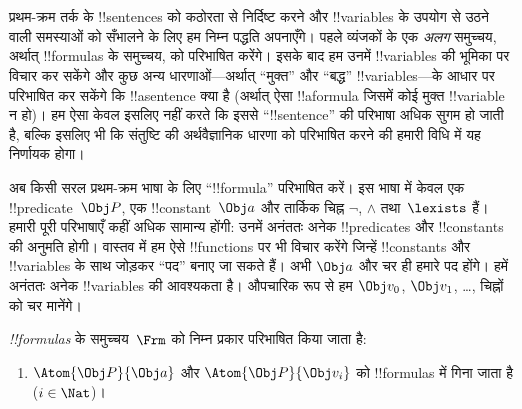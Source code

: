 \documentclass[../../../include/open-logic-section]{subfiles}
\begin{document}

\section{}

प्रथम-क्रम तर्क के !!{sentence}s को कठोरता से निर्दिष्ट करने और !!{variable}s
के उपयोग से उठने वाली समस्याओं को सँभालने के लिए हम निम्न पद्धति अपनाएँगे।
पहले व्यंजकों के एक \emph{अलग} समुच्चय, अर्थात् !!{formula}s के समुच्चय, को परिभाषित
करेंगे। इसके बाद हम उनमें !!{variable}s की भूमिका पर विचार कर सकेंगे और कुछ
अन्य धारणाओं---अर्थात् ``मुक्त'' और ``बद्ध'' !!{variable}s---के आधार पर
परिभाषित कर सकेंगे कि !!a{sentence} क्या है (अर्थात् ऐसा !!a{formula} जिसमें
कोई मुक्त !!{variable} न हो)। हम ऐसा केवल इसलिए नहीं करते कि इससे
``!!{sentence}'' की परिभाषा अधिक सुगम हो जाती है, बल्कि इसलिए भी कि संतुष्टि
की अर्थवैज्ञानिक धारणा को परिभाषित करने की हमारी विधि में यह निर्णायक होगा।

अब किसी सरल प्रथम-क्रम भाषा के लिए ``!!{formula}'' परिभाषित करें। इस भाषा
में केवल एक !!{predicate}~$\Obj P$, एक !!{constant}~$\Obj a$ और तार्किक
चिह्न $\lnot$, $\land$ तथा~$\lexists$ हैं। हमारी पूरी परिभाषाएँ कहीं अधिक
सामान्य होंगी: उनमें अनंततः अनेक !!{predicate}s और !!{constant}s की अनुमति
होगी। वास्तव में हम ऐसे !!{function}s पर भी विचार करेंगे जिन्हें
!!{constant}s और !!{variable}s के साथ जोड़कर ``पद'' बनाए जा सकते हैं। अभी
$\Obj a$ और चर ही हमारे पद होंगे। हमें अनंततः अनेक !!{variable}s की आवश्यकता है।
औपचारिक रूप से हम $\Obj v_0$, $\Obj
v_1$, \dots, चिह्नों को चर मानेंगे।

\begin{defn}
\emph{!!{formula}s} के समुच्चय~$\Frm$ को निम्न प्रकार परिभाषित किया जाता है:
\begin{enumerate}
\item{} $\Atom{\Obj P}{\Obj a}$ और $\Atom{\Obj
  P}{\Obj v_i}$ को !!{formula}s में गिना जाता है ($i \in \Nat$)।




\end{enumerate}
\end{defn}
\end{document}
